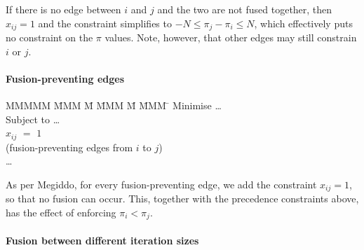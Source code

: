 If there is no edge between $i$ and $j$ and the two are not fused together, then $x_{ij} = 1$ and the constraint simplifies to $-N \le \pi_j - \pi_i \le N$, which effectively puts no constraint on the $\pi$ values.
Note, however, that other edges may still constrain $i$ or $j$.


\paragraph{Fusion-preventing edges}
\begin{tabbing}
MMMMM   \= MMM \= M \= MMM \= M \= MMM \= \kill
Minimise   \> \ldots \\
Subject to \> \ldots \\
           \> $x_{ij}$    \> $=$   \> $1$             \>       \>            \\
           \> (fusion-preventing edges from $i$ to $j$)      \\
           \> \ldots
\end{tabbing}
As per Megiddo\cite{megiddo1998optimal}, for every fusion-preventing edge, we add the constraint $x_{ij} = 1$, so that no fusion can occur. This, together with the precedence constraints above, has the effect of enforcing $\pi_i < \pi_j$.


\paragraph{Fusion between different iteration sizes}

